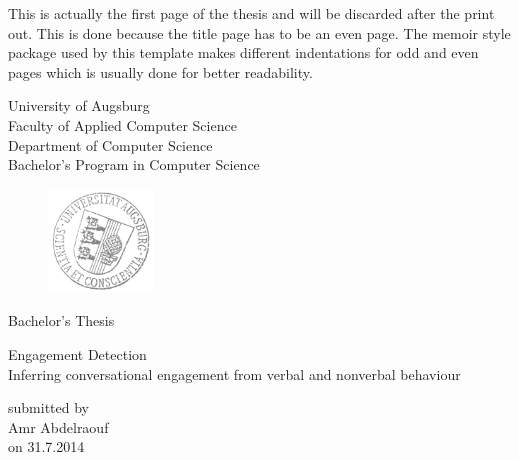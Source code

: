 \documentclass[12pt, a4paper, fleqn]{memoir}%
\begin{document}
\frontmatter

\pagestyle{empty}
This is actually the first page of the thesis and will be discarded after the print out. This is done because 
the title page has to be an even page. The memoir style package used by this template makes different indentations 
for odd and even pages which is usually done for better readability.  
\clearpage

\pagestyle{empty}
\rmfamily
\noindent
\begin{center}
University of Augsburg\\
Faculty of Applied Computer Science\\
Department of Computer Science\\
Bachelor's Program in Computer Science\\
\end{center}
\begin{figure}[h!]
\centering
\includegraphics[width=0.25\textwidth]{logo.png}
\end{figure}
\vfill\vfill
\begin{center}
\Large
Bachelor's Thesis\\
\end{center}
\vspace{2.0em}
\begin{center}
\Large
\LARGE Engagement Detection\\ \vspace{10pt} 
\Large Inferring conversational engagement from verbal and nonverbal behaviour
\end{center}
\vspace{2.0em}
\begin{center}
    \normalsize
    submitted by\\
    \large
    Amr Abdelraouf\\
    \normalsize
    on 31.7.2014
\end{center}
\end{document}
